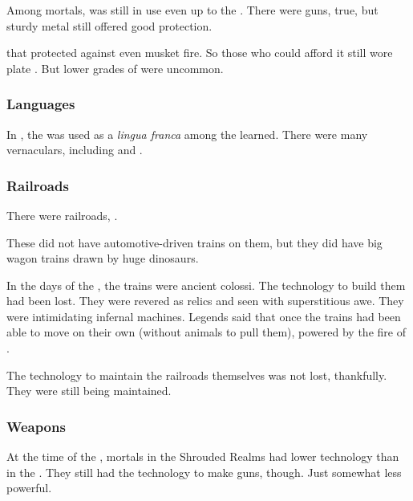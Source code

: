 \subsubsection{\Armour}
Among mortals, \armour was still in use even up to the \thirdbanewar. 
There were guns, true, but sturdy metal \armour still offered good protection. 

 that protected against even musket fire. 
So those who could afford it still wore plate \armour.
But lower grades of \armour were uncommon.





\subsubsection{Languages}
In \Velcad, the  was used as a \emph{lingua franca} among the learned. 
There were many vernaculars, including  and . 





\subsubsection{Railroads}
There were railroads, . 

These did not have automotive-driven trains on them, but they did have big wagon trains drawn by huge dinosaurs.

In the days of the \thirdbanewar, the trains were ancient colossi. 
The technology to build them had been lost. 
They were revered as relics and seen with superstitious awe. 
They were intimidating infernal machines. 
Legends said that once the trains had been able to move on their own (without animals to pull them), powered by the fire of \daemons. 

The technology to maintain the railroads themselves was not lost, thankfully. 
They were still being maintained. 





\subsubsection{Weapons}
At the time of the \thirdbanewar, mortals in the Shrouded Realms had lower technology than in the \VaimonCaliphate. 
They still had the technology to make guns, though. 
Just somewhat less powerful. 

